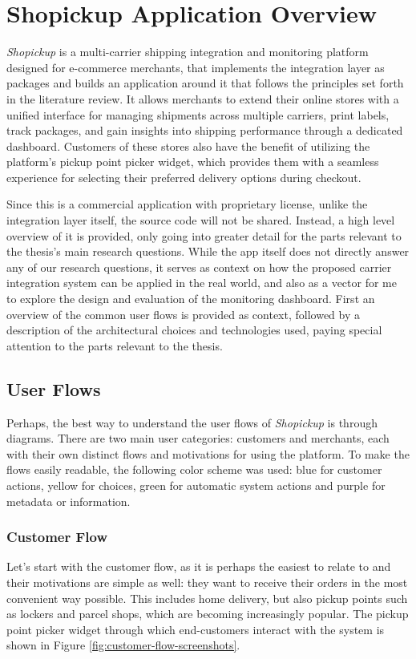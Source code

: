 \documentclass{imc-inf}
\begin{document}
\section{Shopickup Application Overview}
\textit{Shopickup} is a multi-carrier shipping integration and monitoring platform designed for e-commerce merchants, that implements the integration layer as packages and builds an application around it that follows the principles set forth in the literature review.
It allows merchants to extend their online stores with a unified interface for managing shipments across multiple carriers, print labels, track packages, and gain insights into shipping performance through a dedicated dashboard.
Customers of these stores also have the benefit of utilizing the platform's pickup point picker widget, which provides them with a seamless experience for selecting their preferred delivery options during checkout.

Since this is a commercial application with proprietary license, unlike the integration layer itself, the source code will not be shared. Instead, a high level overview of it is provided, only going into greater detail for the parts relevant to the thesis's main research questions.
While the app itself does not directly answer any of our research questions, it serves as context on how the proposed carrier integration system can be applied in the real world, and also as a vector for me to explore the design and evaluation of the monitoring dashboard.
First an overview of the common user flows is provided as context, followed by a description of the architectural choices and technologies used, paying special attention to the parts relevant to the thesis.

\subsection{User Flows}
Perhaps, the best way to understand the user flows of \textit{Shopickup} is through diagrams. There are two main user categories: customers and merchants, each with their own distinct flows and motivations for using the platform.
To make the flows easily readable, the following color scheme was used: blue for customer actions, yellow for choices, green for automatic system actions and purple for metadata or information.

\subsubsection{Customer Flow}
Let's start with the customer flow, as it is perhaps the easiest to relate to and their motivations are simple as well: they want to receive their orders in the most convenient way possible.
This includes home delivery, but also pickup points such as lockers and parcel shops, which are becoming increasingly popular.
The pickup point picker widget through which end-customers interact with the system is shown in Figure \ref{fig:customer-flow-screenshots}.
\end{document}
